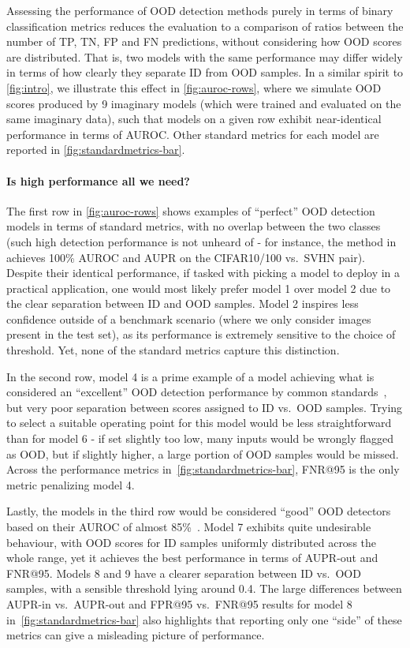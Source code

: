 \documentclass[10pt,twocolumn,letterpaper]{article}
\begin{document}
Assessing the performance of OOD detection methods purely in terms of binary classification metrics reduces the evaluation to a comparison of ratios between the number of TP, TN, FP and FN predictions, without considering how OOD scores are distributed. That is, two models with the same performance may differ widely in terms of how clearly they separate ID from OOD samples. In a similar spirit to \cref{fig:intro}, we illustrate this effect in \cref{fig:auroc-rows}, where we simulate OOD scores produced by 9 imaginary models (which were trained and evaluated on the same imaginary data), such that models on a given row exhibit near-identical performance in terms of AUROC. Other standard metrics for each model are reported in \cref{fig:standardmetrics-bar}. 

\paragraph{Is high performance all we need?} The first row in \cref{fig:auroc-rows} shows examples of ``perfect'' OOD detection models in terms of standard metrics, with no overlap between the two classes (such high detection performance is not unheard of - for instance, the method in~\cite{dhms-ood-2022} achieves 100\% AUROC and AUPR on the CIFAR10/100 vs.~SVHN pair). Despite their identical performance, if tasked with picking a model to deploy in a practical application, one would most likely prefer model 1 over model 2 due to the clear separation between ID and OOD samples. Model 2 inspires less confidence outside of a benchmark scenario (where we only consider images present in the test set), as its performance is extremely sensitive to the choice of threshold. Yet, none of the standard metrics capture this distinction.

In the second row, model 4 is a prime example of a model achieving what is considered an ``excellent'' OOD detection performance by common standards~\cite{baseline-ood-2017}, but very poor separation between scores assigned to ID vs.~OOD samples. Trying to select a suitable operating point for this model would be less straightforward than for model 6 - if set slightly too low, many inputs would be wrongly flagged as OOD, but if slightly higher, a large portion of OOD samples would be missed. Across the performance metrics in~\cref{fig:standardmetrics-bar}, FNR@95 is the only metric penalizing model 4.

Lastly, the models in the third row would be considered ``good'' OOD detectors based on their AUROC of almost 85\%~\cite{baseline-ood-2017}. Model 7 exhibits quite undesirable behaviour, with OOD scores for ID samples uniformly distributed across the whole range, yet it achieves the best performance in terms of AUPR-out and FNR@95. Models 8 and 9 have a clearer separation between ID vs.~OOD samples, with a sensible threshold lying around 0.4. The large differences between AUPR-in vs.~AUPR-out and FPR@95 vs.~FNR@95 results for model 8 in~\cref{fig:standardmetrics-bar} also highlights that reporting only one ``side'' of these metrics can give a misleading picture of performance.
\end{document}
